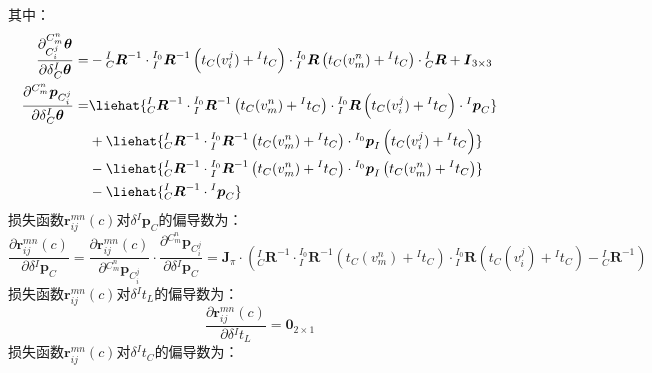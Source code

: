 其中：
\begin{equation*}
  \begin{aligned}
    \frac{\partial ^{C_m^n}_{C_i^j}\boldsymbol{\theta}}{\partial \delta {^{I}_{C}\boldsymbol{\theta}}}= &
    -{^{I}_{C}\boldsymbol{R}^{-1}}
    \cdot{{^{I_0}_{I}}\boldsymbol{R}^{-1}\left( t_{C}(v_i^j)+{^{I}t_C}\right) }
    \cdot{{^{I_0}_{I}}\boldsymbol{R}\left( t_{C}(v_m^n)+{^{I}t_C}\right) }
    \cdot{{^{I}_{C}}\boldsymbol{R}}+\boldsymbol{I}_{3\times 3}
    \\
    \frac{\partial {^{C_m^n}\boldsymbol{p}_{C_i^j}}}{\partial \delta {^{I}_{C}\boldsymbol{\theta}}}=    &
    \liehat{{{^{I}_{C}}\boldsymbol{R}^{-1}}\cdot{{^{I_0}_{I}}\boldsymbol{R}^{-1}\left( t_{C}(v_m^n)+{^{I}t_C}\right) }\cdot{{^{I_0}_{I}}\boldsymbol{R}\left( t_{C}(v_i^j)+{^{I}t_C}\right) }
    \cdot{^{I}\boldsymbol{p}_C}}
    \\&+\liehat{{{^{I}_{C}}\boldsymbol{R}^{-1}}\cdot{{^{I_0}_{I}}\boldsymbol{R}^{-1}\left( t_{C}(v_m^n)+{^{I}t_C}\right) }
    \cdot{^{I_0}\boldsymbol{p}_I\left( t_{C}(v_i^j)+{^{I}t_C}\right)}}
    \\&-\liehat{{{^{I}_{C}}\boldsymbol{R}^{-1}}
    \cdot{{^{I_0}_{I}}\boldsymbol{R}^{-1}\left( t_{C}(v_m^n)+{^{I}t_C}\right) }\cdot{^{I_0}\boldsymbol{p}_I\left( t_{C}(v_m^n)+{^{I}t_C}\right)}}
    \\&-\liehat{{{^{I}_{C}}\boldsymbol{R}^{-1}}\cdot{^{I}\boldsymbol{p}_C}}
  \end{aligned}
\end{equation*}
损失函数$\boldsymbol{r}_{ij}^{mn}(c)$对$\delta{^{I}\boldsymbol{p}_C}$的偏导数为：
\begin{equation}
  \label{equ:jacobian_pci}
  \frac{\partial \boldsymbol{r}_{ij}^{mn}(c)}{\partial \delta {^{I}\boldsymbol{p}_C}}=
  \frac{\partial \boldsymbol{r}_{ij}^{mn}(c)}{\partial {^{C_m^n}\boldsymbol{p}_{C_i^j}}}\cdot
  \frac{\partial {^{C_m^n}\boldsymbol{p}_{C_i^j}}}{\partial \delta {^{I}\boldsymbol{p}_C}}=
  \boldsymbol{J}_{\pi}\cdot
  \left(
  {{^{I}_{C}}\boldsymbol{R}^{-1}}\cdot{{^{I_0}_{I}}\boldsymbol{R}^{-1}\left( t_{C}(v_m^n)+{^{I}t_C}\right) }\cdot{{^{I_0}_{I}}\boldsymbol{R}\left( t_{C}(v_i^j)+{^{I}t_C}\right) }
  -{{^{I}_{C}}\boldsymbol{R}^{-1}}
  \right)
\end{equation}
损失函数$\boldsymbol{r}_{ij}^{mn}(c)$对$\delta{^{I}t_{L}}$的偏导数为：
\begin{equation}
  \frac{\partial \boldsymbol{r}_{ij}^{mn}(c)}{\partial \delta {^{I}t_{L}}}=\boldsymbol{0}_{2\times 1}
\end{equation}
损失函数$\boldsymbol{r}_{ij}^{mn}(c)$对$\delta{^{I}t_{C}}$的偏导数为：
